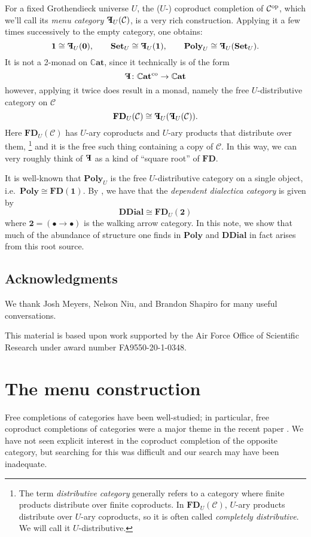 \documentclass[11pt, one side, article]{memoir}
\theoremstyle{definition}
\theoremstyle{plain}
\newcommand{\cat}[1]{\mathcal{#1}}%
\newcommand{\Cat}[1]{\mathbf{#1}}%
\newcommand{\op}{^\tn{op}}
\newcommand{\co}{^\tn{co}}
\newcommand{\tn}[1]{\textnormal{#1}}
\newcommand{\smset}{\Cat{Set}}
\newcommand{\smcat}{\mathbb{C}\Cat{at}}
\newcommand{\poly}{\Cat{Poly}}
\newcommand{\0}{\Cat{0}}
\newcommand{\1}{\Cat{1}}
\newcommand{\fd}{\Cat{FD}}
\newcommand{\mn}{\reflectbox{$\Cat{F}$}}
\newcommand{\ddial}{\Cat{DDial}}
\begin{document}
For a fixed Grothendieck universe $U$, the ($U$-) coproduct completion of $\cat{C}\op$, which we'll call its \emph{menu category} $\mn_U(\cat{C})$, is a very rich construction. Applying it a few times successively to the empty category, one obtains:
\[
	\1\cong \mn_U(\0),\qquad
	\smset_U\cong\mn_U(\1),\qquad
	\poly_U\cong\mn_U(\smset_U).
\]
It is not a 2-monad on $\smcat$, since it technically is of the form
\[
\mn\colon\smcat\co\to\smcat
\]
however, applying it twice does result in a monad, namely the free $U$-distributive category on $\cat{C}$
\[
\fd_U(\cat{C})\cong\mn_U(\mn_U(\cat{C})).
\]
Here $\fd_U(\cat{C})$ has $U$-ary coproducts and $U$-ary products that distribute over them,%
\footnote{The term \emph{distributive category} generally refers to a category where finite products distribute over finite coproducts. In $\fd_U(\cat{C})$, $U$-ary products distribute over $U$-ary coproducts, so it is often called \emph{completely distributive}. We will call it $U$-distributive.}
 and it is the free such thing containing a copy of $\cat{C}$. In this way, we can very roughly think of $\mn$ as a kind of ``square root'' of $\fd$. 

It is well-known that $\poly_U$ is the free $U$-distributive category on a single object, i.e.\ $\poly\cong\fd(\1)$. By \cite{moss2018dialectica}, we have that the \emph{dependent dialectica category} is given by 
\[\ddial\cong\fd_U(\Cat{2})\]
where $\Cat{2}=(\bullet\to\bullet)$ is the walking arrow category. In this note, we show that much of the abundance of structure one finds in $\poly$ and $\ddial$ in fact arises from this root source.

\section*{Acknowledgments}
We thank Josh Meyers, Nelson Niu, and Brandon Shapiro for many useful conversations.  

This material is based upon work supported by the Air Force Office of Scientific Research under award number FA9550-20-1-0348.


\chapter{The menu construction}

Free completions of categories have been well-studied; in particular, free coproduct completions of categories were a major theme in the recent paper \cite{adamek2020nice}. We have not seen explicit interest in the coproduct completion of the opposite category, but searching for this was difficult and our search may have been inadequate.
\end{document}
